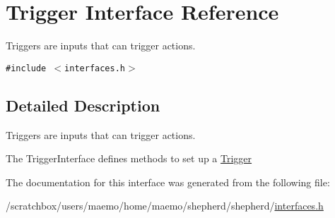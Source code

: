 \hypertarget{interface_trigger}{
\section{Trigger Interface Reference}
\label{interface_trigger}
}
Triggers are inputs that can trigger actions.  


{\tt \#include $<$interfaces.h$>$}



\subsection{Detailed Description}
Triggers are inputs that can trigger actions. 

The TriggerInterface defines methods to set up a \hyperlink{interface_trigger}{Trigger} 

The documentation for this interface was generated from the following file:\begin{CompactItemize}
\item 
/scratchbox/users/maemo/home/maemo/shepherd/shepherd/\hyperlink{interfaces_8h}{interfaces.h}\end{CompactItemize}
